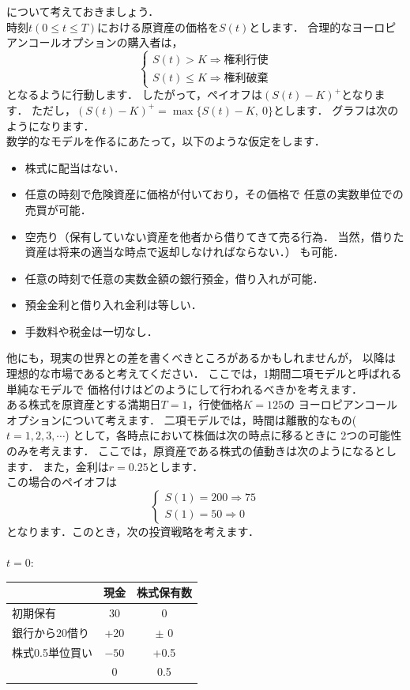 について考えておきましょう．\\
時刻$t(0\leq t\leq T)$における原資産の価格を$S(t)$とします．
合理的なヨーロピアンコールオプションの購入者は，
\[
\begin{cases}
 S(t)>K\Longrightarrow 権利行使\\
 S(t)\leq K\Longrightarrow 権利破棄
\end{cases}
\]
となるように行動します．
したがって，ペイオフは$(S(t)-K)^+$となります．
ただし，$(S(t)-K)^+=\max\{S(t)-K,\ 0\}$とします．
グラフは次のようになります．
\[

\]
数学的なモデルを作るにあたって，以下のような仮定をします．
\begin{itemize}
 \item 株式に配当はない．
 \item 任意の時刻で危険資産に価格が付いており，その価格で
       任意の実数単位での売買が可能．
 \item 空売り（保有していない資産を他者から借りてきて売る行為．
       当然，借りた資産は将来の適当な時点で返却しなければならない．）
       も可能．
 \item 任意の時刻で任意の実数金額の銀行預金，借り入れが可能．
 \item 預金金利と借り入れ金利は等しい．
 \item 手数料や税金は一切なし．
\end{itemize}
他にも，現実の世界との差を書くべきところがあるかもしれませんが，
以降は理想的な市場であると考えてください．
ここでは，1期間二項モデルと呼ばれる単純なモデルで
価格付けはどのようにして行われるべきかを考えます．
\\
ある株式を原資産とする満期日$T=1$，行使価格$K=125$の
ヨーロピアンコールオプションについて考えます．
二項モデルでは，時間は離散的なもの($t=1,2,3,\cdots$)
として，各時点において株価は次の時点に移るときに
2つの可能性のみを考えます．
ここでは，原資産である株式の値動きは次のようになるとします．
また，金利は$r=0.25$とします．
\[
 
\] 
この場合のペイオフは
\[
 \begin{cases}
  S(1)=200\Longrightarrow 75\\
  S(1)=50\Longrightarrow 0
 \end{cases}
\]
となります．このとき，次の投資戦略を考えます．\\
\\
$t=0$:
\begin{center}
 \begin{tabular}{|l|c|c|}\hline
  & 現金&株式保有数 \\ \hline \hline
  初期保有&30 &0 \\
  銀行から20借り&+20 &$\pm$ 0 \\
  株式0.5単位買い&$-50$ &+0.5 \\ \hline
  &0 &0.5 \\ \hline
 \end{tabular}
\end{center}
